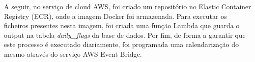 A seguir, no serviço de cloud AWS, foi criado um repositório no Elastic Container Registry (ECR), onde a imagem Docker foi armazenada. Para executar os ficheiros presentes nesta imagem, foi criada uma função Lambda que guarda o output na tabela \textit{daily\_flags} da base de dados. Por fim, de forma a garantir que este processo é executado diariamente, foi programada uma calendarização do mesmo através do serviço AWS Event Bridge. 


































